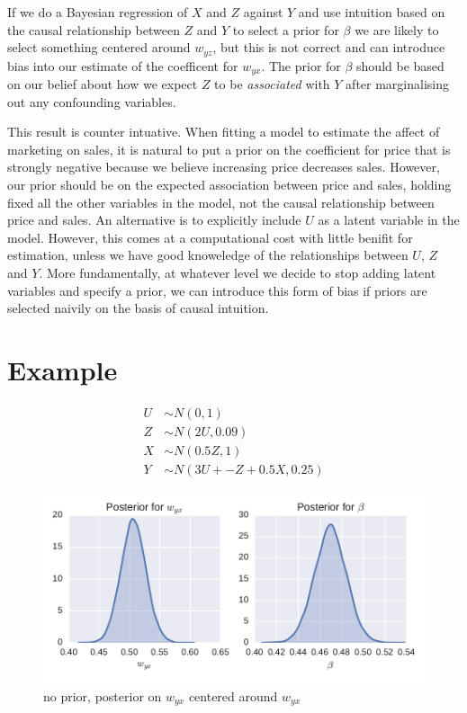 \documentclass[11pt,a4paper,oneside]{book}
\newcommand{\eqn}[1]{\begin{align}#1\end{align}}
\theoremstyle{plain}
\theoremstyle{definition}
\begin{document}
If we do a Bayesian regression of $X$ and $Z$ against $Y$ and use intuition based on the causal relationship between $Z$ and $Y$ to select a prior for $\beta$ we are likely to select something centered around $w_{yz}$, but this is not correct and can introduce bias into our estimate of the coefficent for $w_{yx}$. The prior for $\beta$ should be based on our belief about how we expect $Z$ to be \emph{associated} with $Y$ after marginalising out any confounding variables. 

This result is counter intuative. When fitting a model to estimate the affect of marketing on sales, it is natural to put a prior on the coefficient for price that is strongly negative because we believe increasing price decreases sales. However, our prior should be on the expected association between price and sales, holding fixed all the other variables in the model, not the causal relationship between price and sales. An alternative is to explicitly include $U$ as a latent variable in the model. However, this comes at a computational cost with little benifit for estimation, unless we have good knoweledge of the relationships between $U$, $Z$ and $Y$. More fundamentally, at whatever level we decide to stop adding latent variables and specify a prior, we can introduce this form of bias if priors are selected naivily on the basis of causal intuition. 


\section{Example}

\eqn{
U &\sim N(0 , 1)\\
Z &\sim N(2U , 0.09)\\
X &\sim N(0.5Z , 1)\\
Y &\sim N(3U + -Z + 0.5X , 0.25)
}

\begin{figure}[h]
\includegraphics[scale=.3]{prior_no_prior}
\caption{no prior, posterior on $w_{yx}$ centered around $w_{yx}$}
\end{figure}
\end{document}
